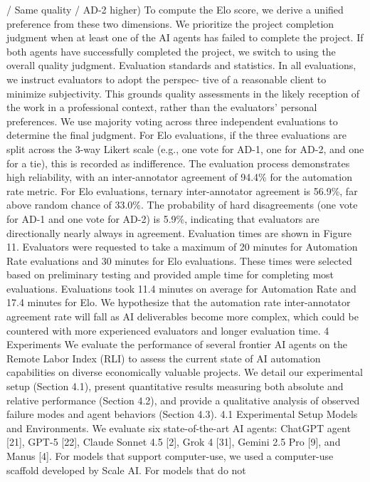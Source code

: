/ Same quality / AD-2 higher)
To compute the Elo score, we derive a unified preference from these two dimensions. We prioritize the
project completion judgment when at least one of the AI agents has failed to complete the project. If
both agents have successfully completed the project, we switch to using the overall quality judgment.
Evaluation standards and statistics.
In all evaluations, we instruct evaluators to adopt the perspec-
tive of a reasonable client to minimize subjectivity. This grounds quality assessments in the likely
reception of the work in a professional context, rather than the evaluators’ personal preferences. We
use majority voting across three independent evaluations to determine the final judgment. For Elo
evaluations, if the three evaluations are split across the 3-way Likert scale (e.g., one vote for AD-1,
one for AD-2, and one for a tie), this is recorded as indifference.
The evaluation process demonstrates high reliability, with an inter-annotator agreement of 94.4\%
for the automation rate metric. For Elo evaluations, ternary inter-annotator agreement is 56.9\%, far
above random chance of 33.0\%. The probability of hard disagreements (one vote for AD-1 and one
vote for AD-2) is 5.9\%, indicating that evaluators are directionally nearly always in agreement.
Evaluation times are shown in Figure 11. Evaluators were requested to take a maximum of 20 minutes
for Automation Rate evaluations and 30 minutes for Elo evaluations. These times were selected
based on preliminary testing and provided ample time for completing most evaluations. Evaluations
took 11.4 minutes on average for Automation Rate and 17.4 minutes for Elo. We hypothesize that
the automation rate inter-annotator agreement rate will fall as AI deliverables become more complex,
which could be countered with more experienced evaluators and longer evaluation time.
4
Experiments
We evaluate the performance of several frontier AI agents on the Remote Labor Index (RLI) to assess
the current state of AI automation capabilities on diverse economically valuable projects. We detail
our experimental setup (Section 4.1), present quantitative results measuring both absolute and relative
performance (Section 4.2), and provide a qualitative analysis of observed failure modes and agent
behaviors (Section 4.3).
4.1
Experimental Setup
Models and Environments.
We evaluate six state-of-the-art AI agents: ChatGPT agent [21], GPT-5
[22], Claude Sonnet 4.5 [2], Grok 4 [31], Gemini 2.5 Pro [9], and Manus [4]. For models that support
computer-use, we used a computer-use scaffold developed by Scale AI. For models that do not
